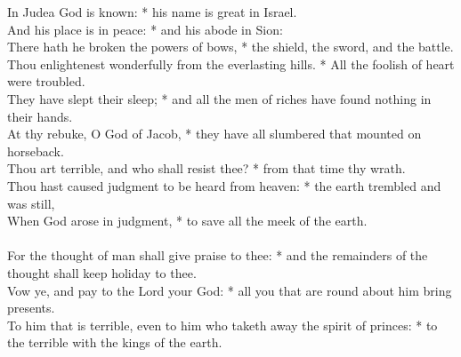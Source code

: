\begin{Parallel}[v]{\colw}{\colx}
{}
{\vern
{\noindent
In Judea God is known: * his name is great in Israel.\\
And his place is in peace: * and his abode in Sion:\\
There hath he broken the powers of bows, * the shield, the sword, and the battle.\\
Thou enlightenest wonderfully from the everlasting hills. * All the foolish of heart were troubled.\\
They have slept their sleep; * and all the men of riches have found nothing in their hands.\\
At thy rebuke, O God of Jacob, * they have all slumbered that mounted on horseback.\\
Thou art terrible, and who shall resist thee? * from that time thy wrath.\\
Thou hast caused judgment to be heard from heaven: * the earth trembled and was still,\\
When God arose in judgment, * to save all the meek of the earth.\\ \\
For the thought of man shall give praise to thee: * and the remainders of the thought shall keep holiday to thee.\\
Vow ye, and pay to the Lord your God: * all you that are round about him bring presents.\\
To him that is terrible, even to him who taketh away the spirit of princes: * to the terrible with the kings of the earth.}}

\end{Parallel}


